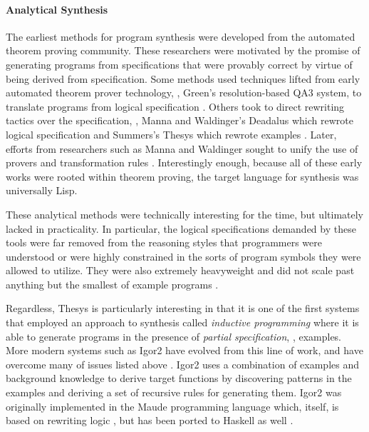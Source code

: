 \paragraph{Analytical Synthesis}
The earliest methods for program synthesis were developed from the automated
theorem proving community.  These researchers were motivated by the promise of
generating programs from specifications that were provably correct by virtue of
being derived from specification.  Some methods used techniques lifted from
early automated theorem prover technology, \eg, Green's resolution-based QA3
system, to translate programs from logical specification
\cite{green-ijcai-1969}.  Others took to direct rewriting tactics over the
specification, \eg, Manna and Waldinger's Deadalus which rewrote logical
specification \cite{manna-tse-1979} and Summers's Thesys which rewrote examples
\cite{summers-popl-1976}.  Later, efforts from researchers such as Manna and
Waldinger sought to unify the use of provers and transformation rules
\cite{manna-plas-1980}.  Interestingly enough, because all of these early works
were rooted within theorem proving, the target language for synthesis was
universally Lisp.

These analytical methods were technically interesting for the time, but
ultimately lacked in practicality.  In particular, the logical specifications
demanded by these tools were far removed from the reasoning styles that
programmers were understood or were highly constrained in the sorts of program
symbols they were allowed to utilize.  They were also extremely heavyweight and
did not scale past anything but the smallest of example programs
\cite{kreitz-automated-deduction-1998}.

Regardless, Thesys is particularly interesting in that it is one of the first
systems that employed an approach to synthesis called \emph{inductive
programming} \cite{kitzelmann-aaip-2010} where it is able to generate programs
in the presence of \emph{partial specification}, \eg, examples.  More modern
systems such as Igor2 have evolved from this line of work, and have overcome
many of issues listed above \cite{kitzelmann-thesis-2010}.  Igor2 uses a
combination of examples and background knowledge to derive target functions by
discovering patterns in the examples and deriving a set of recursive rules for
generating them.  Igor2 was originally implemented in the Maude programming
language which, itself, is based on rewriting logic \cite{clavel-wrla-2000}, but
has been ported to Haskell as well \cite{hofmann-aaip-2010}.

